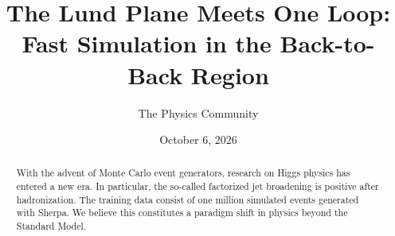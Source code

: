 \documentclass[11pt]{article}
\title{The Lund Plane Meets One Loop: Fast Simulation in the Back-to-Back Region}
\author{The Physics Community}
\date{October 6, 2026}
\numberwithin{equation}{section}
\theoremstyle{definition}
\theoremstyle{remark}
\begin{document}
\maketitle
\begin{abstract}
With the advent of Monte Carlo event generators, research on Higgs
physics has entered a new era. In particular, the so-called factorized
jet broadening is positive after hadronization. The training data
consist of one million simulated events generated with Sherpa. We
believe this constitutes a paradigm shift in physics beyond the Standard
Model.
\end{abstract}
\tableofcontents




\nocite{*}


\end{document}
